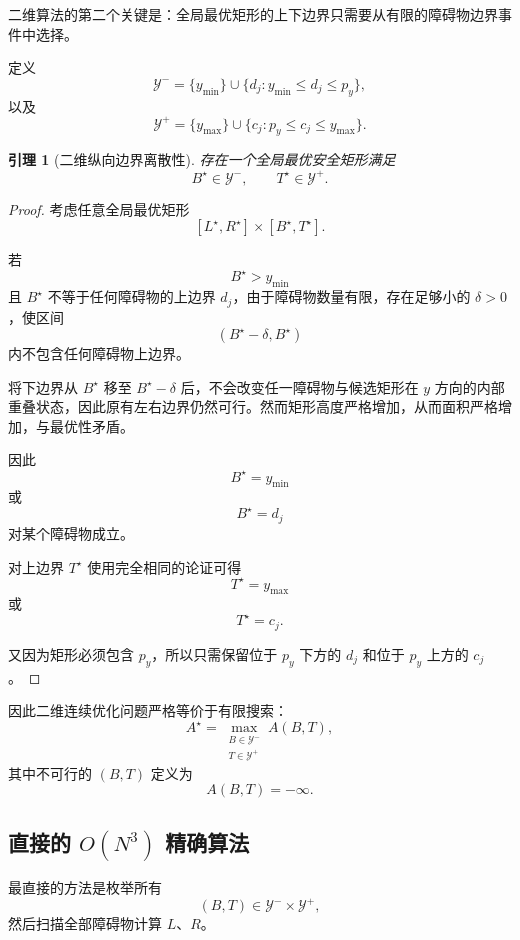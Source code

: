 \documentclass[UTF8,12pt,a4paper]{ctexart}
\newtheorem{lemma}{引理}
\begin{document}
二维算法的第二个关键是：全局最优矩形的上下边界只需要从有限的障碍物边界事件中选择。

定义
\begin{equation}
\boxed{
\mathcal Y^-
=
\{y_{\min}\}
\cup
\{d_j:
y_{\min}\le d_j\le p_y\},
}
\end{equation}
以及
\begin{equation}
\boxed{
\mathcal Y^+
=
\{y_{\max}\}
\cup
\{c_j:
p_y\le c_j\le y_{\max}\}.
}
\end{equation}

\begin{lemma}[二维纵向边界离散性]
存在一个全局最优安全矩形满足
\begin{equation}
    B^\star\in\mathcal Y^-,
    \qquad
    T^\star\in\mathcal Y^+.
\end{equation}
\end{lemma}

\begin{proof}
考虑任意全局最优矩形
\[
[L^\star,R^\star]\times[B^\star,T^\star].
\]

若
\[
B^\star>y_{\min}
\]
且 $B^\star$ 不等于任何障碍物的上边界 $d_j$，由于障碍物数量有限，存在足够小的 $\delta>0$，使区间
\[
(B^\star-\delta,B^\star)
\]
内不包含任何障碍物上边界。

将下边界从 $B^\star$ 移至 $B^\star-\delta$ 后，不会改变任一障碍物与候选矩形在 $y$ 方向的内部重叠状态，因此原有左右边界仍然可行。然而矩形高度严格增加，从而面积严格增加，与最优性矛盾。

因此
\[
B^\star=y_{\min}
\]
或
\[
B^\star=d_j
\]
对某个障碍物成立。

对上边界 $T^\star$ 使用完全相同的论证可得
\[
T^\star=y_{\max}
\]
或
\[
T^\star=c_j.
\]

又因为矩形必须包含 $p_y$，所以只需保留位于 $p_y$ 下方的 $d_j$ 和位于 $p_y$ 上方的 $c_j$。
\end{proof}

因此二维连续优化问题严格等价于有限搜索：
\begin{equation}
\boxed{
A^\star
=
\max_{\substack{
B\in\mathcal Y^-\\
T\in\mathcal Y^+}}
A(B,T),
}
\end{equation}
其中不可行的 $(B,T)$ 定义为
\[
A(B,T)=-\infty.
\]

\subsection{直接的 \texorpdfstring{$O(N^3)$}{O(N3)} 精确算法}

最直接的方法是枚举所有
\[
(B,T)\in\mathcal Y^-\times\mathcal Y^+,
\]
然后扫描全部障碍物计算 $L$、$R$。
\end{document}
